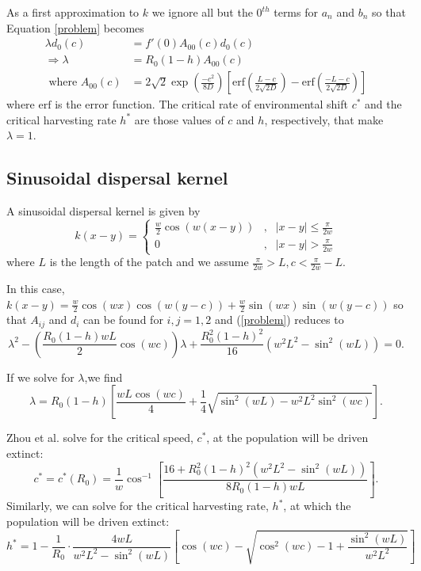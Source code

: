 \documentclass[12pt,english]{article}
\begin{document}
As a first approximation to $k$ we ignore all but the $0^{th}$ terms for $a_n$ and $b_n$ so that Equation \ref{problem} becomes
\begin{align*}
\lambda d_0(c)&=f'(0)A_{00}(c)d_0(c)
\\ \Rightarrow \lambda&=R_0(1-h)A_{00}(c)
\\\text{ where } A_{00}(c)&=2\sqrt{2}\exp\left(\frac{-c^2}{8D}\right)\left[\text{erf}\left(\frac{L-c}{2\sqrt{2D}}\right)-\text{erf}\left(\frac{-L-c}{2\sqrt{2D}}\right)\right]
\end{align*}
where $\text{erf}$ is the error function.  The critical rate of environmental shift $c^*$ and the critical harvesting rate $h^*$ are those values of $c$ and $h$, respectively, that make $\lambda=1$.

\subsection{Sinusoidal dispersal kernel }
A sinusoidal dispersal kernel is given by 
$$k(x-y)=\left\{\begin{array}{ccccc}
\frac{w}{2}\cos(w(x-y)) & , & |x-y|\leq\frac{\pi}{2w}
\\ 0 & , & |x-y|>\frac{\pi}{2w}
\end{array}\right.
$$
where $L$ is the length of the patch and we assume $\frac{\pi}{2w}>L,c<\frac{\pi}{2w}-L$.

In this case, $k(x-y)=\frac{w}{2}\cos(wx)\cos(w(y-c))+\frac{w}{2}\sin(wx)\sin(w(y-c))$ so that $A_{ij}$ and $d_i$ can be found for $i,j=1,2$ and (\ref{problem}) reduces to 
$$\lambda^2-\left(\frac{R_0(1-h)wL}{2}\cos(wc)\right)\lambda+\frac{R_0^2(1-h)^2}{16}\left(w^2L^2-\sin^2(wL)\right)=0.$$

If we solve for $\lambda$,we find
\begin{equation} \lambda=R_0(1-h)\left[\frac{wL\cos(wc)}{4}+\frac{1}{4}\sqrt{\sin^2(wL)-w^2L^2\sin^2(wc)}\right]. \label{cosine} \end{equation}


Zhou et al. \citep{ZhouKot2011} solve for the critical speed, $c^*$, at the population will be driven extinct:
$$c^*=c^*(R_0)=\frac{1}{w}\cos^{-1}\left[\frac{16+R_0^2(1-h)^2(w^2L^2-\sin^2(wL))}{8R_0(1-h)wL}\right].$$
Similarly, we can solve for the critical harvesting rate, $h^*$, at which the population will be driven extinct:
$$
h^*=1-\frac{1}{R_0}\cdot\frac{4wL}{w^2L^2-\sin^2(wL)}\left[\cos(wc)-\sqrt{\cos^2(wc)-1+\frac{\sin^2(wL)}{w^2L^2}}\right] 
$$
\end{document}
